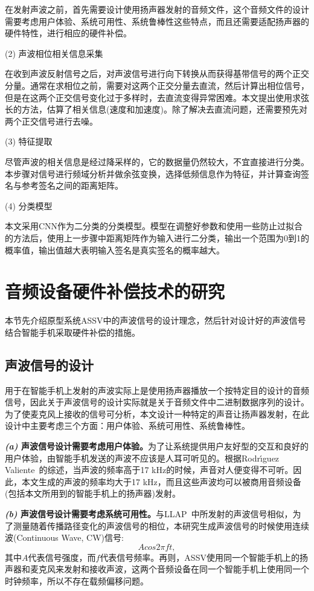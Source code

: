 在发射声波之前，首先需要设计使用扬声器发射的音频文件，这个音频文件的设计需要考虑用户体验、系统可用性、系统鲁棒性这些特点，而且还需要适配扬声器的硬件特性，进行相应的硬件补偿。


(2) 声波相位相关信息采集

在收到声波反射信号之后，对声波信号进行向下转换从而获得基带信号的两个正交分量。通常在求相位之前，需要对这两个正交分量去直流，然后计算出相位信号，但是在这两个正交信号变化过于多样时，去直流变得异常困难。本文提出使用求弦长的方法，估算了相关信息(速度和加速度)。除了解决去直流问题，还需要预先对两个正交信号进行去噪。


(3) 特征提取

尽管声波的相关信息是经过降采样的，它的数据量仍然较大，不宜直接进行分类。本步骤对信号进行频域分析并做余弦变换，选择低频信息作为特征，并计算查询签名与参考签名之间的距离矩阵。

(4) 分类模型

本文采用CNN作为二分类的分类模型。模型在调整好参数和使用一些防止过拟合的方法后，使用上一步骤中距离矩阵作为输入进行二分类，输出一个范围为0到1的概率值，输出值越大表明输入签名是真实签名的概率越大。

\section{音频设备硬件补偿技术的研究}\label{sec:audio-research}

本节先介绍原型系统ASSV中的声波信号的设计理念，然后针对设计好的声波信号结合智能手机采取硬件补偿的措施。

\subsection{声波信号的设计}

用于在智能手机上发射的声波实际上是使用扬声器播放一个按特定目的设计的音频信号，因此关于声波信号的设计实际就是关于音频文件中二进制数据序列的设计。为了使麦克风上接收的信号可分析，本文设计一种特定的声音让扬声器发射，在此设计中主要考虑三个方面：用户体验、系统可用性、系统鲁棒性。

\textbf{\textit{(a)} 声波信号设计需要考虑用户体验。}为了让系统提供用户友好型的交互和良好的用户体验，由智能手机发送的声波不应该是人耳可听见的。根据Rodr{\'\i}guez Valiente~\cite{rodriguez2014extended}的综述，当声波的频率高于17 kHz的时候，声音对人便变得不可听。因此，本文生成的声波的频率均大于17 kHz，而且这些声波均可以被商用音频设备(包括本文所用到的智能手机上的扬声器)发射。

\textbf{\textit{(b)} 声波信号设计需要考虑系统可用性。}与LLAP~\cite{wang2016device}中所发射的声波信号相似，为了测量随着传播路径变化的声波信号的相位，本研究生成声波信号的时候使用连续波(Continuous Wave, CW)信号:
$$
Acos2\pi ft, 
$$
其中$A$代表信号强度，而$f$代表信号频率。再则，ASSV使用同一个智能手机上的扬声器和麦克风来发射和接收声波，这两个音频设备在同一个智能手机上使用同一个时钟频率，所以不存在载频偏移问题。

